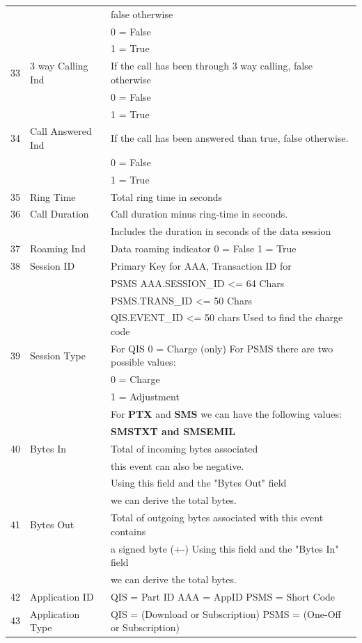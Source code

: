 \documentclass[12pt,twoside]{article}
\begin{document}
\begin{longtable}{c|l|l}
&  & false otherwise\\
&  & 0 = False\\
&  & 1 = True\\
33 & 3 way Calling Ind & If the call has been through 3 way calling, false otherwise\\
&  & 0 = False\\
&  & 1 = True\\
34 & Call Answered Ind & If the call has been answered than true, false otherwise.\\
&  & 0 = False\\
&  & 1 = True\\
35 & Ring Time & Total ring time in seconds\\
36 & Call Duration & Call duration minus ring-time in seconds.\\
&  & Includes the duration in seconds of the data session\\
37 & Roaming Ind & Data roaming indicator 0 = False 1 = True\\
38 & Session ID & Primary Key for AAA, Transaction ID for\\
&  & PSMS AAA.SESSION\_ID <= 64 Chars\\
&  & PSMS.TRANS\_ID <= 50 Chars\\
&  & QIS.EVENT\_ID <= 50 chars Used to find the charge code\\
39 & Session Type & For QIS 0 = Charge (only) For PSMS there are two possible values:\\
&  & 0 = Charge\\
&  & 1 = Adjustment\\
&  & For \textbf{PTX} and \textbf{SMS} we can have the following values:\\
&  & \textbf{SMSTXT and SMSEMIL}\\
40 & Bytes In & Total of incoming bytes associated\\
&  & this event can also be negative.\\
&  & Using this field and the "Bytes Out" field\\
&  & we can derive the total bytes.\\
41 & Bytes Out & Total of outgoing bytes associated with this event contains\\
&  & a signed byte (+-) Using this field and the "Bytes In" field\\
&  & we can derive the total bytes.\\
42 & Application ID & QIS = Part ID AAA = AppID PSMS = Short Code\\
43 & Application Type & QIS = (Download or Subscription) PSMS = (One-Off or Subscription)\\

\end{longtable}
\end{document}
